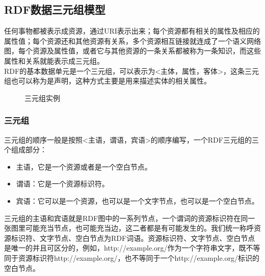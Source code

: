     \subsection{RDF数据三元组模型}
    \indent
    任何事物都被表示成资源，通过URI表示出来；每个资源都有相关的属性及相应的属性值；每个资源还和其他资源有关系，多个资源相互链接就连成了一个语义网络图，每个资源及属性值，或者它与其他资源的一条关系都被称为一条知识，而这些属性和关系就能表示成三元组。\\
    \indent
    RDF的基本数据单元是一个三元组，可以表示为<主体，属性，客体>，这条三元组也可以称为是声明，这种方式主要是用来描述实体的相关属性。
    \begin{figure}[htb]
    \caption{\label{1} 三元组实例}
    \end{figure}

    \subsubsection{三元组}
    \indent
    三元组的顺序一般是按照<主语，谓语，宾语>的顺序编写，一个RDF三元组的三个组成部分：
    \begin{itemize}
    \item 主语，它是一个资源或者是一个空白节点。
    \item 谓语：它是一个资源标识符。
    \item 宾语：它可以是一个资源，也可以是一个文字节点，也可以是一个空白节点。
    \end{itemize}
    \indent
    三元组的主语和宾语就是RDF图中的一系列节点，一个谓词的资源标识符在同一张图里可能充当节点，也可能充当边，这二者都是有可能发生的。我们统一称呼资源标识符、文字节点、空白节点为RDF词语。资源标识符、文字节点、空白节点是唯一的并且可区分的，例如，http://example.org/作为一个字符串文字，既不等同于资源标识符http://example.org/，也不等同于一个http://example.org/标识的空白节点。\\
